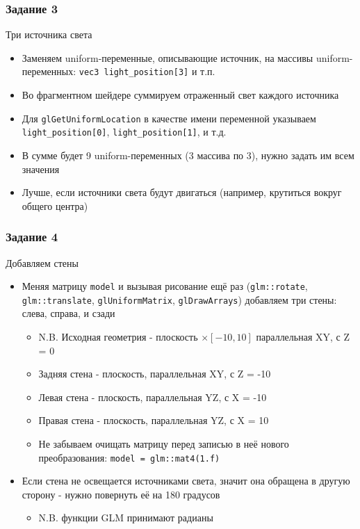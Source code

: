 \documentclass{beamer}
\begin{document}
\begin{frame}[fragile]
\frametitle{Задание 3}
Три источника света
\begin{itemize}
\item Заменяем uniform-переменные, описывающие источник, на массивы uniform-переменных: \verb|vec3 light_position[3]| и т.п.
\pause
\item Во фрагментном шейдере суммируем отраженный свет каждого источника
\pause
\item Для \verb|glGetUniformLocation| в качестве имени переменной указываем \verb|light_position[0]|, \verb|light_position[1]|, и т.д.
\pause
\item В сумме будет 9 uniform-переменных (3 массива по 3), нужно задать им всем значения
\pause
\item Лучше, если источники света будут двигаться (например, крутиться вокруг общего центра)
\end{itemize}
\end{frame}

\begin{frame}[fragile]
\frametitle{Задание 4}
Добавляем стены
\begin{itemize}
\item Меняя матрицу \verb|model| и вызывая рисование ещё раз (\verb|glm::rotate|, \verb|glm::translate|, \verb|glUniformMatrix|, \verb|glDrawArrays|) добавляем три стены: слева, справа, и сзади
\pause
\begin{itemize}
\item N.B. Исходная геометрия - плоскость \begin{math}[-10, 10]\times[-10, 10]\end{math} параллельная XY, с Z = 0
\item Задняя стена - плоскость, параллельная XY, с Z = -10
\item Левая стена - плоскость, параллельная YZ, с X = -10
\item Правая стена - плоскость, параллельная YZ, с X = 10
\pause
\item Не забываем очищать матрицу перед записью в неё нового преобразования: \verb|model = glm::mat4(1.f)|
\end{itemize}
\pause
\item Если стена не освещается источниками света, значит она обращена в другую сторону - нужно повернуть её на 180 градусов 
\begin{itemize}
\item N.B. функции GLM принимают радианы
\end{itemize}
\end{itemize}
\end{frame}
\end{document}
